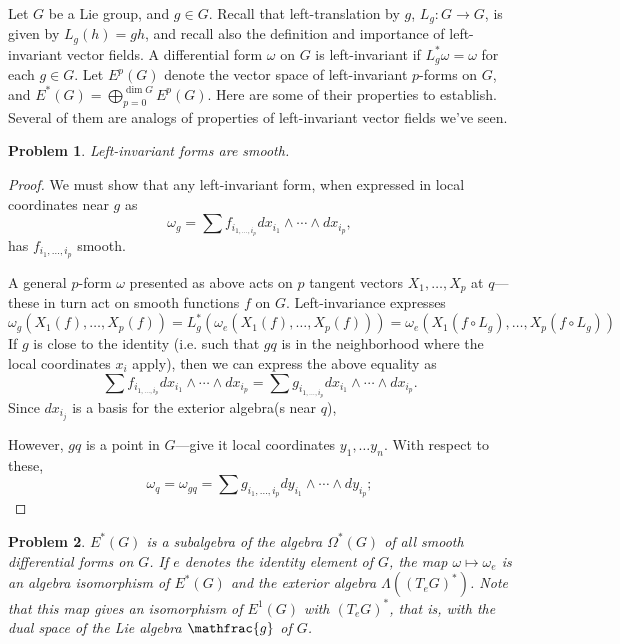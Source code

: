 \documentclass{article}
\newtheorem{plm}{Problem}
\begin{document}
Let $G$ be a Lie group, and $g \in G$.
Recall that left-translation by $g$, $L_{g}: G \to G$, is given by $L_{g}(h) = gh$,
and recall also the definition and importance of left-invariant vector fields.
A differential form $\omega$ on $G$ is left-invariant if $L_{g}^{*}\omega = \omega$ for each $g \in G$.
Let $E^{p}(G)$ denote the vector space of left-invariant $p$-forms on $G$, and $E^{*}(G) = \bigoplus_{p = 0}^{\dim G}E^{p}(G)$.
Here are some of their properties to establish.
Several of them are analogs of properties of left-invariant vector fields we've seen.

\begin{plm}
  Left-invariant forms are smooth.
\end{plm}

\begin{proof}
  We must show that any left-invariant form, when expressed in local coordinates near $g$ as
  \[
    \omega_{g} = \sum f_{i_{1, \ldots, i_{p}}}dx_{i_{1}} \wedge \cdots \wedge dx_{i_{p}},
  \]
  has $f_{i_{1}, \ldots, i_{p}}$ smooth.

  A general $p$-form $\omega$ presented as above acts on $p$ tangent vectors $X_{1}, \ldots, X_{p}$ at $q$---these
  in turn act on smooth functions $f$ on $G$.
  Left-invariance expresses
  \[
    \omega_{g}(X_{1}(f), \ldots, X_{p}(f)) = L_{g}^{*}(\omega_{e}(X_{1}(f), \ldots, X_{p}(f)))
    = \omega_{e}(X_{1}(f \circ L_{g}), \ldots, X_{p}(f \circ L_{g}))
  \]
  If $g$ is close to the identity (i.e. such that $gq$ is in the neighborhood where the local coordinates $x_{i}$ apply),
  then we can express the above equality as
  \[
    \sum f_{i_{1, \ldots, i_{p}}}dx_{i_{1}} \wedge \cdots \wedge dx_{i_{p}}
    = \sum g_{i_{1, \ldots, i_{p}}}dx_{i_{1}} \wedge \cdots \wedge dx_{i_{p}}.
  \]
  Since $dx_{i_{j}}$ is a basis for the exterior algebra(s near $q$),
  
  However, $gq$ is a point in $G$---give it local coordinates $y_{1}, \ldots y_{n}$.
  With respect to these,
  \[
    \omega_{q} = \omega_{gq} = \sum g_{i_{1}, \ldots, i_{p}} dy_{i_{1}} \wedge \cdots \wedge dy_{i_{p}};
  \]

\end{proof}

\begin{plm}
  $E^{*}(G)$ is a subalgebra of the algebra $\Omega^{*}(G)$ of all smooth differential forms on $G$.
  If $e$ denotes the identity element of $G$, the map $\omega \mapsto \omega_{e}$ is an algebra isomorphism of $E^{*}(G)$
  and the exterior algebra $\Lambda((T_{e}G)^{*})$.
  Note that this map gives an isomorphism of $E^{1}(G)$ with $(T_{e}G)^{*}$, that is, with the dual space of the Lie algebra $\mathfrac{g}$
  of $G$.
\end{plm}
\end{document}
